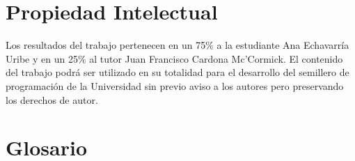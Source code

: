 \documentclass[11pt, oneside]{article}
\theoremstyle{definition}
\theoremstyle{remark}
\begin{document}
\section{Propiedad Intelectual}
Los resultados del trabajo pertenecen en un 75$\%$ a la estudiante Ana Echavarría Uribe y en un 25$\%$ al tutor Juan Francisco Cardona Mc'Cormick. El contenido del trabajo podrá ser utilizado en su totalidad para el desarrollo del semillero de programación de la Universidad sin previo aviso a los autores pero preservando los derechos de autor.

\section{ Glosario}
\end{document}
